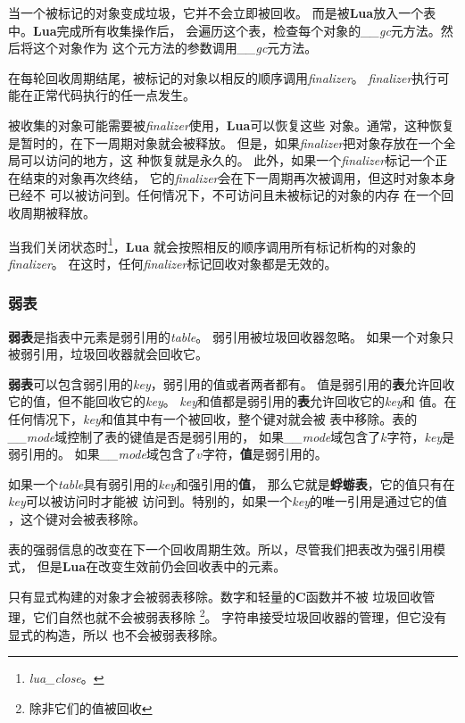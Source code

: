 \documentclass{ctexart}
\begin{document}
当一个被标记的对象变成垃圾，它并不会立即被回收。
而是被\textbf{Lua}放入一个表中。\textbf{Lua}完成所有收集操作后，
会遍历这个表，检查每个对象的\emph{\_\_gc}元方法。然后将这个对象作为
这个元方法的参数调用\emph{\_\_gc}元方法。

在每轮回收周期结尾，被标记的对象以相反的顺序调用\emph{finalizer}。
\emph{finalizer}执行可能在正常代码执行的任一点发生。

被收集的对象可能需要被\emph{finalizer}使用，\textbf{Lua}可以恢复这些
对象。通常，这种恢复是暂时的，在下一周期对象就会被释放。
但是，如果\emph{finalizer}把对象存放在一个全局可以访问的地方，这
种恢复就是永久的。
此外，如果一个\emph{finalizer}标记一个正在结束的对象再次终结，
它的\emph{finalizer}会在下一周期再次被调用，但这时对象本身已经不
可以被访问到。任何情况下，不可访问且未被标记的对象的内存
在一个回收周期被释放。

当我们关闭状态时\footnote{\emph{lua\_close}。}，\textbf{Lua}
就会按照相反的顺序调用所有标记析构的对象的\emph{finalizer}。
在这时，任何\emph{finalizer}标记回收对象都是无效的。

\subsubsection{弱表}

\textbf{弱表}是指表中元素是弱引用的\emph{table}。
弱引用被垃圾回收器忽略。
如果一个对象只被弱引用，垃圾回收器就会回收它。

\textbf{弱表}可以包含弱引用的\emph{key}，弱引用的值或者两者都有。
值是弱引用的\textbf{表}允许回收它的值，但不能回收它的\emph{key}。
\emph{key}和值都是弱引用的\textbf{表}允许回收它的\emph{key}和
值。在任何情况下，\emph{key}和值其中有一个被回收，整个键对就会被
表中移除。表的\emph{\_\_mode}域控制了表的键值是否是弱引用的，
如果\emph{\_\_mode}域包含了$k$字符，\emph{key}是弱引用的。
如果\emph{\_\_mode}域包含了$v$字符，\textbf{值}是弱引用的。

如果一个\emph{table}具有弱引用的\emph{key}和强引用的\textbf{值}，
那么它就是\textbf{蜉蝣表}，它的值只有在\emph{key}可以被访问时才能被
访问到。特别的，如果一个\emph{key}的唯一引用是通过它的值
，这个键对会被表移除。

表的强弱信息的改变在下一个回收周期生效。所以，尽管我们把表改为强引用模式，
但是\textbf{Lua}在改变生效前仍会回收表中的元素。

只有显式构建的对象才会被弱表移除。数字和轻量的\textbf{C}函数并不被
垃圾回收管理，它们自然也就不会被弱表移除
\footnote{除非它们的值被回收}。
字符串接受垃圾回收器的管理，但它没有显式的构造，所以
也不会被弱表移除。
\end{document}
